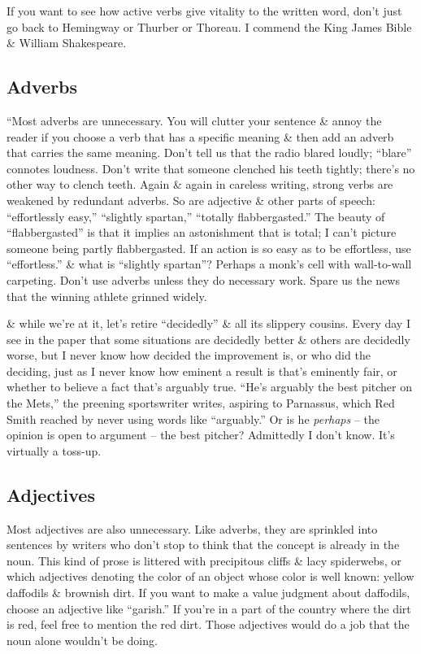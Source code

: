 \documentclass{article}
\begin{document}
If you want to see how active verbs give vitality to the written word, don't just go back to Hemingway or Thurber or Thoreau. I commend the King James Bible \& William Shakespeare.

\subsection{Adverbs}
``Most adverbs are unnecessary. You will clutter your sentence \& annoy the reader if you choose a verb that has a specific meaning \& then add an adverb that carries the same meaning. Don't tell us that the radio blared loudly; ``blare'' connotes loudness. Don't write that someone clenched his teeth tightly; there's no other way to clench teeth. Again \& again in careless writing, strong verbs are weakened by redundant adverbs. So are adjective \& other parts of speech: ``effortlessly easy,'' ``slightly spartan,'' ``totally flabbergasted.'' The beauty of ``flabbergasted'' is that it implies an astonishment that is total; I can't picture someone being partly flabbergasted. If an action is so easy as to be effortless, use ``effortless.'' \& what is ``slightly spartan''? Perhaps a monk's cell with wall-to-wall carpeting. Don't use adverbs unless they do necessary work. Spare us the news that the winning athlete grinned widely.

\& while we're at it, let's retire ``decidedly'' \& all its slippery cousins. Every day I see in the paper that some situations are decidedly better \& others are decidedly worse, but I never know how decided the improvement is, or who did the deciding, just as I never know how eminent a result is that's eminently fair, or whether to believe a fact that's arguably true. ``He's arguably the best pitcher on the Mets,'' the preening sportswriter writes, aspiring to Parnassus, which Red Smith reached by never using words like ``arguably.'' Or is he \textit{perhaps} -- the opinion is open to argument -- the best pitcher? Admittedly I don't know. It's virtually a toss-up.

\subsection{Adjectives}
Most adjectives are also unnecessary. Like adverbs, they are sprinkled into sentences by writers who don't stop to think that the concept is already in the noun. This kind of prose is littered with precipitous cliffs \& lacy spiderwebs, or which adjectives denoting the color of an object whose color is well known: yellow daffodils \& brownish dirt. If you want to make a value judgment about daffodils, choose an adjective like ``garish.'' If you're in a part of the country where the dirt is red, feel free to mention the red dirt. Those adjectives would do a job that the noun alone wouldn't be doing.
\end{document}
